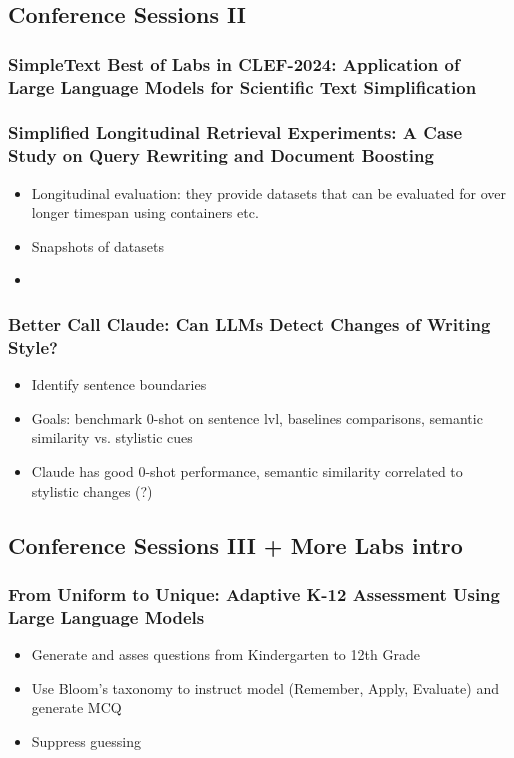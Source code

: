 \documentclass[a4paper]{article}
\begin{document}
\subsection{Conference Sessions II}
\subsubsection{SimpleText Best of Labs in CLEF-2024: Application of Large Language Models for Scientific Text Simplification}
\subsubsection{Simplified Longitudinal Retrieval Experiments: A Case Study on Query Rewriting and Document Boosting}
\begin{itemize}
    \item Longitudinal evaluation: they provide datasets that can be evaluated for over longer timespan using containers etc.
    \item Snapshots of datasets
    \item
\end{itemize}
\subsubsection{Better Call Claude: Can LLMs Detect Changes of Writing Style?}
\begin{itemize}
    \item Identify sentence boundaries
    \item Goals: benchmark 0-shot on sentence lvl, baselines comparisons, semantic similarity vs. stylistic cues
    \item Claude has good 0-shot performance, semantic similarity correlated to stylistic changes (?)
\end{itemize}
\subsection{Conference Sessions III + More Labs intro}
\subsubsection{From Uniform to Unique: Adaptive K-12 Assessment Using Large Language Models}
\begin{itemize}
    \item Generate and asses questions from Kindergarten to 12th Grade
    \item Use Bloom's taxonomy to instruct model (Remember, Apply, Evaluate) and generate MCQ
    \item Suppress guessing
\end{itemize}
\end{document}
